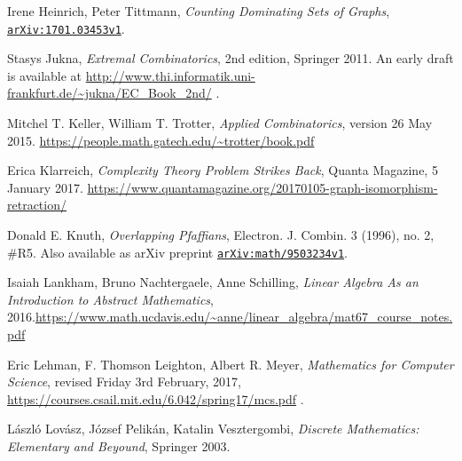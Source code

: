 \documentclass[numbers=enddot,12pt,final,onecolumn,notitlepage]{scrartcl}%
\theoremstyle{definition}
\newcommand\arxiv[1]{\href{http://www.arxiv.org/abs/#1}{\texttt{arXiv:#1}}}
\begin{document}
\begin{thebibliography}{9999999999}
Irene Heinrich, Peter Tittmann,
\textit{Counting Dominating Sets of Graphs},
\arxiv{1701.03453v1}.

Stasys Jukna,
\textit{Extremal Combinatorics}, 2nd edition, Springer 2011.
An early draft is available at
\url{http://www.thi.informatik.uni-frankfurt.de/~jukna/EC_Book_2nd/} .


Mitchel T. Keller, William T. Trotter,
\textit{Applied Combinatorics},
version 26 May 2015.
\newline \url{https://people.math.gatech.edu/~trotter/book.pdf}

Erica Klarreich,
\textit{Complexity Theory Problem Strikes Back},
Quanta Magazine, 5 January 2017.
\newline \url{https://www.quantamagazine.org/20170105-graph-isomorphism-retraction/}

 Donald E. Knuth,
\textit{Overlapping Pfaffians},
Electron. J. Combin. 3 (1996), no. 2, \#R5.
Also available as arXiv preprint \arxiv{math/9503234v1}.


Isaiah Lankham, Bruno Nachtergaele, Anne
Schilling, \textit{Linear Algebra As an Introduction to Abstract Mathematics},
2016.\newline\url{https://www.math.ucdavis.edu/~anne/linear_algebra/mat67_course_notes.pdf}

Eric Lehman, F. Thomson Leighton, Albert R. Meyer,
\textit{Mathematics for Computer Science}, revised Friday 3rd February,
2017, \newline\url{https://courses.csail.mit.edu/6.042/spring17/mcs.pdf} .

L\'aszl\'o Lov\'asz, J\'ozsef Pelik\'an,
Katalin Vesztergombi,
\textit{Discrete Mathematics: Elementary and Beyound},
Springer 2003.



\end{thebibliography}
\end{document}

